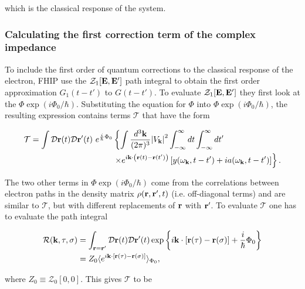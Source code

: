 which is the classical response of the system. 

\subsubsection{Calculating the first correction term of the complex impedance}
\label{subsubsec:2-3-1-3}

To include the first order of quantum corrections to the classical response of the electron, FHIP use the $\mathcal{Z}_1[\vb{E}, \vb{E'}]$ path integral to obtain the first order approximation $G_1(t-t')$ to $G(t-t')$. To evaluate $\mathcal{Z}_1[\vb{E}, \vb{E'}]$ they first look at the $\Phi \exp(i \Phi_0 / \hbar)$. Substituting the equation for $\Phi$ into $\Phi \exp(i \Phi_0 / \hbar)$, the resulting expression contains terms $\mathcal{T}$ that have the form

\begin{equation}
    \begin{aligned}
        \mathcal{T} = \int \mathcal{D}\vb{r}(t) \mathcal{D}\vb{r'}(t)\ e^{\frac{i}{\hbar} \Phi_0} &\left\{ \int \frac{d^3\vb{k}}{(2\pi)^3} \abs{V_{\vb{k}}}^2 \int^\infty_{-\infty} dt \int^\infty_{-\infty} dt' \right. \\ &\left. \times e^{i\vb{k}\cdot\left(\vb{r}(t) - \vb{r}(t')\right)} \left[ y(\omega_{\vb{k}}, t-t') + ia(\omega_{\vb{k}}, t-t') \right] \right\}.
    \end{aligned}
\end{equation}

The two other terms in $\Phi \exp(i \Phi_0 / \hbar)$ come from the correlations between electron paths in the density matrix $\rho(\vb{r}, \vb{r}', t)$ (i.e. off-diagonal terms) and are similar to $\mathcal{T}$, but with different replacements of $\vb{r}$ with $\vb{r'}$. To evaluate $\mathcal{T}$ one has to evaluate the path integral

\begin{equation}
    \begin{aligned}
    \mathcal{R}(\vb{k}, \tau, \sigma) &= \int_{\vb{r} = \vb{r'}} \mathcal{D}\vb{r}(t) \mathcal{D}\vb{r'}(t) \exp\left\{ i \vb{k} \cdot \left[ \vb{r}(\tau) - \vb{r}(\sigma) \right] + \frac{i}{\hbar} \Phi_0 \right\} \\
    &= Z_0 \langle e^{i \vb{k} \cdot [\vb{r}(\tau) - \vb{r}(\sigma)]}  \rangle_{\Phi_0},
    \end{aligned}
\end{equation}

where $Z_0 \equiv \mathcal{Z}_0[0, 0]$. This gives $\mathcal{T}$ to be

